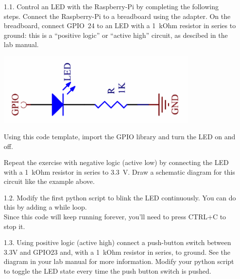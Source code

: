 \begin{enumerate}
\item [1.1.] Control an LED with the Raspberry-Pi by completing the following steps.
Connect the Raspberry-Pi to a breadboard using the adapter.
On the breadboard, connect GPIO~24 to an LED with a 1~kOhm resistor in series to ground: this is a ``positive logic'' or ``active high'' circuit, as descibed in the lab manual.

\vspace*{-3mm}
\begin{center}                                        
{\includegraphics[width=10cm]{figs/ActiveHighLED}}
\end{center}

\newpage
Using this code template, import the GPIO library and turn the LED on and off.


Repeat the exercise with negative logic (active low) by connecting the LED with a 1~kOhm resistor in series to 3.3~V.
Draw a schematic diagram for this circuit like the example above.
 

\item [1.2.] Modify the first python script to blink the LED continuously.
You can do this by adding a while loop. \\



Since this code will keep running forever, you'll need to press CTRL+C to stop it.
 

\item [1.3.] Using positive logic (active high) connect a push-button switch between 3.3V and GPIO23 and, with a 1~kOhm resistor in series, to ground.
See the diagram in your lab manual for more information.
Modify your python script to toggle the LED state every time the push button switch is pushed. \\



\end{enumerate}


